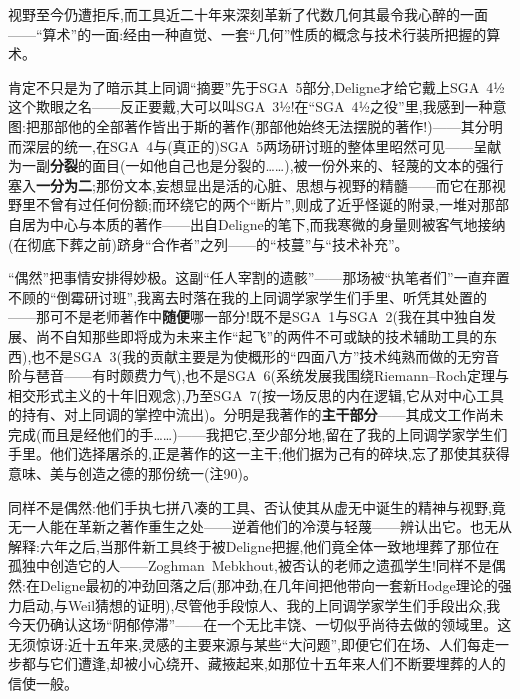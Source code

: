 视野至今仍遭拒斥,而工具近二十年来深刻革新了代数几何其最令我心醉的一面——“算术”的一面:经由一种直觉、一套“几何”性质的概念与技术行装所把握的算术。

肯定不只是为了暗示其上同调“摘要”先于SGA~5部分,Deligne才给它戴上SGA~4½这个欺眼之名——反正要戴,大可以叫SGA~3½!在“SGA~4½之役”里,我感到一种意图:把那部他的全部著作皆出于斯的著作(那部他始终无法摆脱的著作!)——其分明而深层的统一,在SGA~4与(真正的)SGA~5两场研讨班的整体里昭然可见——呈献为一副\textbf{分裂}的面目(一如他自己也是分裂的……),被一份外来的、轻蔑的文本的强行塞入\textbf{一分为二};那份文本,妄想显出是活的心脏、思想与\dmark{}视野的精髓——而它在那视野里不曾有过任何份额;而环绕它的两个“断片”,则成了近乎怪诞的附录,一堆对那部自居为中心与本质的著作——出自Deligne的笔下,而我寒微的身量则被客气地接纳(在彻底下葬之前)跻身“合作者”之列——的“枝蔓”与“技术补充”。

“偶然”把事情安排得妙极。这副“任人宰割的遗骸”——那场被“执笔者们”一直弃置不顾的“倒霉研讨班”,我离去时落在我的上同调学家学生们手里、听凭其处置的——那可不是老师著作中\textbf{随便}哪一部分!既不是SGA~1与SGA~2(我在其中独自发展、尚不自知那些即将成为未来主作“起飞”的两件不可或缺的技术辅助工具的东西),也不是SGA~3(我的贡献主要是为使概形的“四面八方”技术纯熟而做的无穷音阶与琶音——有时颇费力气),也不是SGA~6(系统发展我围绕Riemann--Roch定理与相交形式主义的十年旧观念),乃至SGA~7(按一场反思的内在逻辑,它从对中心工具的持有、对上同调的掌控中流出)。分明是我著作的\textbf{主干部分}——其成文工作尚未完成(而且是经他们的手……)——我把它,至少部分地,留在了我的上同调学家学生们手里。他们选择屠杀的,正是著作的这一主干;他们据为己有的碎块,忘了那使其获得意味、美与创造之德的那份统一(注90)。

同样不是偶然:他们手执七拼八凑的工具、否认使其从虚无中诞生的精神与视野,竟无一人能在革新之著作重生之处——逆着他们的冷漠与轻蔑——辨认出它。也无从解释:六年之后,当那件新工具终于被Deligne把握,他们竟全体一致地埋葬了那位在孤独中创造它的人——Zoghman~Mebkhout\dmark{},被否认的老师之遗孤学生!同样不是偶然:在Deligne最初的冲劲回落之后(那冲劲,在几年间把他带向一套新Hodge理论的强力启动,与Weil猜想的证明),尽管他手段惊人、我的上同调学家学生们手段出众,我今天仍确认这场“阴郁停滞”——在一个无比丰饶、一切似乎尚待去做的领域里。这无须惊讶:近十五年来,灵感的主要来源与某些“大问题”,即便它们在场、人们每走一步都与它们遭逢,却被小心绕开、藏掖起来,如那位十五年来人们不断要埋葬的人的信使一般。


